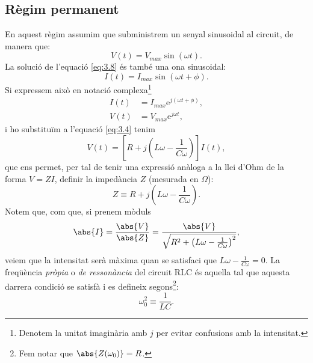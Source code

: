 \documentclass[a4paper,10.5pt]{report}
\begin{document}
\subsection{Règim permanent}
En aquest règim assumim que subministrem un senyal sinusoidal al circuit, de manera que:
\begin{equation}
	V(t) = V_{max} \sin (\omega t). \label{eq:3.12}
\end{equation} 
La solució de l'equació \eqref{eq:3.8} és també una ona sinusoidal:
\begin{equation}
	I(t) = I_{max}\sin(\omega t + \phi).
\end{equation}
Si expressem això en notació complexa\footnote{Denotem la unitat imaginària amb $j$ per evitar confusions amb la intensitat.}
\begin{align}
	I(t) & = I_{max} \mathrm{e}^{j(\omega t + \phi)}, \\
	V(t) & = V_{max} \mathrm{e}^{j\omega t},
\end{align}
i ho substituïm a l'equació \eqref{eq:3.4} tenim
\begin{equation}
	V(t) = \left[R+j \left(L\omega - \frac{1}{C\omega}\right)\right]I(t),
\end{equation}
que ens permet, per tal de tenir una expressió anàloga a la llei d'Ohm de la forma $V=ZI$, definir la impedància $Z$ (mesurada en $\Omega$):
\begin{equation}
	Z \equiv R+j\left(L\omega - \frac{1}{C\omega}\right).
\end{equation}
Notem que, com que, si prenem mòduls
\begin{equation}
	\abs{I} = \frac{\abs{V}}{\abs{Z}} = \frac{\abs{V}}{\sqrt{R^2+\left( L\omega - \frac{1}{C\omega}\right)^2 }}, \label{eq:3.18}
\end{equation}
veiem que la intensitat serà màxima quan se satisfaci que $L\omega - \frac{1}{C\omega} = 0$. La freqüència \textit{pròpia} o \textit{de ressonància} del circuit RLC és aquella tal que aquesta darrera condició se satisfà i es defineix segons\footnote{Fem notar que $\abs{Z(\omega_0)} = R$.}:
\begin{equation}
	\omega_0^2 \equiv \frac{1}{LC} \label{eq:3.19}.
\end{equation}
\end{document}
